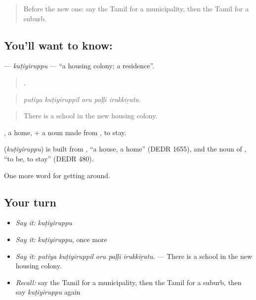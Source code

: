 \label{lesson:TA-C423-kutiyiruppu}



\begin{quote}
Before the new one: say the Tamil for a municipality, then the Tamil for a suburb.
\end{quote}

\subsection*{You'll want to know: }
\textbf{} — \emph{kuṭiyiruppu} — \textquotedblleft{}a housing colony; a residence\textquotedblright{}.

\begin{quote}
    .
\end{quote}

\begin{quote}
\emph{putiya kuṭiyiruppil oru paḷḷi irukkiṟatu.}
\end{quote}

\begin{quote}
There is a school in the new housing colony.
\end{quote}

, a home, + a noun made from , to stay.

\begin{cousinweb}
\textbf{} (\emph{kuṭiyiruppu}) is built from , \textquotedblleft{}a house, a home\textquotedblright{} (DEDR 1655), and the noun of , \textquotedblleft{}to be, to stay\textquotedblright{} (DEDR 480).
\end{cousinweb}

\begin{grammarlens}[title={What you've built}]
One more word for getting around.
\end{grammarlens}

\subsection*{Your turn}
\begin{itemize}
\raggedright
  \item \emph{Say it:} \emph{kuṭiyiruppu}
  \item \emph{Say it:} \emph{kuṭiyiruppu}, once more
  \item \emph{Say it:} \emph{putiya kuṭiyiruppil oru paḷḷi irukkiṟatu.} — There is a school in the new housing colony.
  \item \emph{Recall:} say the Tamil for a municipality, then the Tamil for a suburb, then say \emph{kuṭiyiruppu} again
\end{itemize}

